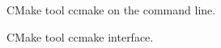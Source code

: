 \documentclass[fleqn,12pt,openany]{book}
\begin{document}
\begin{figure}[H]
\caption{CMake tool ccmake on the command line.}
\end{figure}

\begin{figure}[H]
\caption{CMake tool ccmake interface.}
\end{figure}
\end{document}
